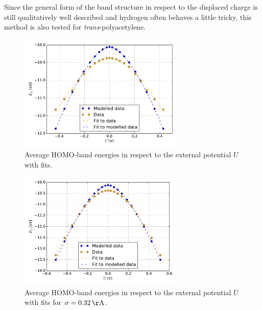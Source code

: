 Since the general form of the band structure in respect to the displaced charge is still qualitatively well described and hydrogen often behaves a little tricky, this method is also tested for \emph{trans}-polyacetylene.
\begin{figure}[!p]
	\centering
	\includegraphics[width = 0.7\textwidth]{Images/Hydrogen/charging/Homo_energy_charge}
	\caption{Average HOMO-band energies in respect to the external potential $U$ with fits.}
	\label{image_hydrogen_homo_energy_charging}
\end{figure}
\begin{figure}[!p]
	\centering
	\includegraphics[width = 0.7\textwidth]{Images/Hydrogen/charging/Homo_energy_charge_sigma_32}
	\caption{Average HOMO-band energies in respect to the external potential $U$ with fits for $\sigma = \unit[0.32]{\AA}$.}
	\label{image_hydrogen_homo_energy_charging_sigma_32}
\end{figure}
\newpage
